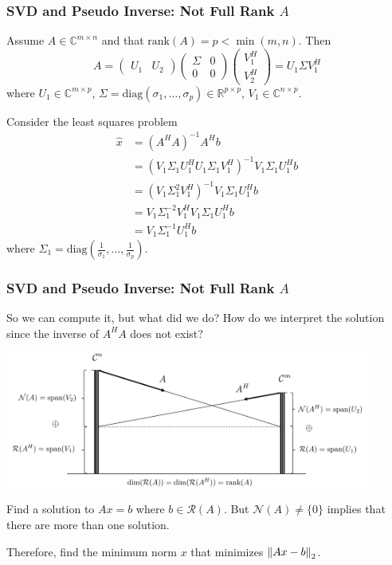 \documentclass{beamer}
\begin{document}
\begin{frame}\frametitle{SVD and Pseudo Inverse: Not Full Rank $A$}
	Assume $A\in\mathbb{C}^{m\times n}$ and that $\text{rank}(A) = p < \min(m,n)$.  Then
	\[ 
		A = 
			\begin{pmatrix} 
				U_1 & U_2	
			\end{pmatrix}
			\begin{pmatrix}
				\Sigma & 0 \\ 0 & 0	
			\end{pmatrix}
			\begin{pmatrix}
				V_1^H \\ V_2^H	
			\end{pmatrix}
		= U_1 \Sigma V_1^H
	\]
	where
	$U_1\in\mathbb{C}^{m\times p}$, 
	$\Sigma = \text{diag}(\sigma_1, \dots, \sigma_p) \in \mathbb{R}^{p\times p}$,
	$V_1 \in \mathbb{C}^{n \times p}$.

	Consider the least squares problem
	\begin{align*}
		\hat{x} &= (A^HA)^{-1}A^Hb\\
		&= (V_1\Sigma_1U_1^HU_1\Sigma_1V_1^H)^{-1}V_1\Sigma_1U_1^Hb\\
		&= (V_1\Sigma_1^2V_1^H)^{-1}V_1\Sigma_1U_1^Hb\\
		&= V_1\Sigma_1^{-2}V_1^HV_1\Sigma_1U_1^Hb\\
		&= V_1\Sigma_1^{-1}U_1^Hb
	\end{align*}
	where 
	$\Sigma_1 = \text{diag}(\frac{1}{\sigma_1}, \dots, \frac{1}{\sigma_p})$.
\end{frame}

\begin{frame}\frametitle{SVD and Pseudo Inverse: Not Full Rank $A$}
	So we can compute it, but what did we do?  How do we interpret the solution since the inverse of $A^HA$ does not exist?
	
	\begin{center}
		\includegraphics[width=0.9\textwidth]
			{figures/chap7_fundamental_subspace_3}
	\end{center}
	
	
	Find a solution to $Ax = b$ where $b \in \mathcal{R}(A)$.  But $\mathcal{N}(A)\neq \{0\}$ implies that there are more than one solution.
	
	\vfill
	
	Therefore, find the minimum norm $x$ that minimizes 
	$\left\|Ax - b\right\|_2$.
\end{frame}
\end{document}
